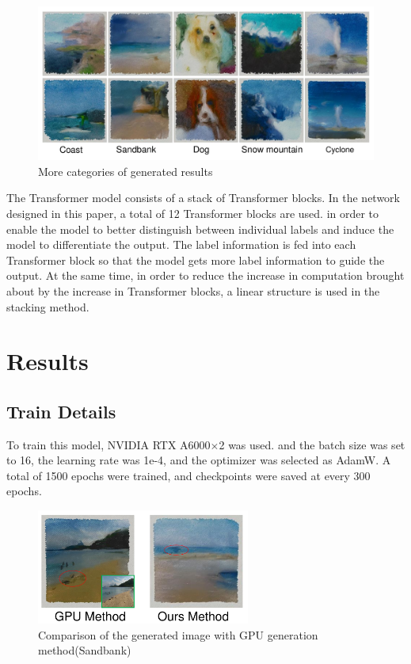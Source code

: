 \documentclass{acsman}
\begin{document}
\begin{figure}[tbp]
    \centering
    \includegraphics[width=15cm]{image/eva1.pdf}
    \caption{More categories of generated results}
    \label{fig:eva1}
\end{figure}
The Transformer model consists of a stack of Transformer blocks. In the network designed in this paper, a total of 12 Transformer blocks are used. in order to enable the model to better distinguish between individual labels and induce the model to differentiate the output. The label information is fed into each Transformer block so that the model gets more label information to guide the output. At the same time, in order to reduce the increase in computation brought about by the increase in Transformer blocks, a linear structure is used in the stacking method.

\section{Results}\label{sec:result}
\subsection{Train Details}
To train this model, NVIDIA RTX A6000$\times$2 was used. and the batch size was set to 16, the learning rate was 1e-4, and the optimizer was selected as AdamW. A total of 1500 epochs were trained, and checkpoints were saved at every 300 epochs.
\begin{figure}[h]
    \centering
    \includegraphics[width=7cm]{image/wGPU.pdf}
    \caption{Comparison of the generated image with GPU generation method(Sandbank)}
    \label{fig:wGPU}
\end{figure}
\end{document}

